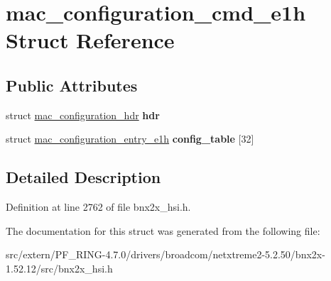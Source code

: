 \hypertarget{structmac__configuration__cmd__e1h}{
\section{mac\_\-configuration\_\-cmd\_\-e1h Struct Reference}
\label{structmac__configuration__cmd__e1h}
}
\subsection*{Public Attributes}
\begin{DoxyCompactItemize}
\item 
\hypertarget{structmac__configuration__cmd__e1h_a10dae2a6bd9b6cb7235c9532c225e62e}{
struct \hyperlink{structmac__configuration__hdr}{mac\_\-configuration\_\-hdr} {\bfseries hdr}}
\label{structmac__configuration__cmd__e1h_a10dae2a6bd9b6cb7235c9532c225e62e}

\item 
\hypertarget{structmac__configuration__cmd__e1h_a862d2b5e7621563f012068094c54f5c7}{
struct \hyperlink{structmac__configuration__entry__e1h}{mac\_\-configuration\_\-entry\_\-e1h} {\bfseries config\_\-table} \mbox{[}32\mbox{]}}
\label{structmac__configuration__cmd__e1h_a862d2b5e7621563f012068094c54f5c7}

\end{DoxyCompactItemize}


\subsection{Detailed Description}


Definition at line 2762 of file bnx2x\_\-hsi.h.



The documentation for this struct was generated from the following file:\begin{DoxyCompactItemize}
\item 
src/extern/PF\_\-RING-\/4.7.0/drivers/broadcom/netxtreme2-\/5.2.50/bnx2x-\/1.52.12/src/bnx2x\_\-hsi.h\end{DoxyCompactItemize}
